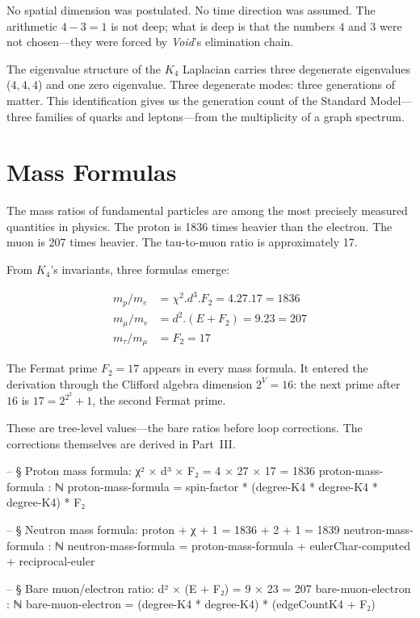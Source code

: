 \documentclass[11pt,a4paper]{book}
\def\cdot{.}%
\begin{document}
No spatial dimension was postulated. No time direction was assumed. The arithmetic $4 - 3 = 1$ is not deep; what is deep is that the numbers $4$ and $3$ were not chosen---they were forced by \textit{Void}'s elimination chain.%

The eigenvalue structure of the $K_4$ Laplacian carries three degenerate eigenvalues ($4, 4, 4$) and one zero eigenvalue. Three degenerate modes: three generations of matter. This identification gives us the generation count of the Standard Model---three families of quarks and leptons---from the multiplicity of a graph spectrum.

\section{Mass Formulas}

The mass ratios of fundamental particles are among the most precisely measured quantities in physics. The proton is 1836 times heavier than the electron. The muon is 207 times heavier. The tau-to-muon ratio is approximately 17.

From $K_4$'s invariants, three formulas emerge:

\begin{align}
m_p / m_e &= \chi^2 \cdot d^3 \cdot F_2 = 4 \cdot 27 \cdot 17 = 1836 \\
m_\mu / m_e &= d^2 \cdot (E + F_2) = 9 \cdot 23 = 207 \\
m_\tau / m_\mu &= F_2 = 17
\end{align}

The Fermat prime $F_2 = 17$ appears in every mass formula. It entered the derivation through the Clifford algebra dimension $2^V = 16$: the next prime after $16$ is $17 = 2^{2^2} + 1$, the second Fermat prime.%

These are tree-level values---the bare ratios before loop corrections. The corrections themselves are derived in Part~III.

\begin{code}
-- § Proton mass formula: χ² × d³ × F₂ = 4 × 27 × 17 = 1836
proton-mass-formula : ℕ
proton-mass-formula = spin-factor * (degree-K4 * degree-K4 * degree-K4) * F₂

-- § Neutron mass formula: proton + χ + 1 = 1836 + 2 + 1 = 1839
neutron-mass-formula : ℕ
neutron-mass-formula = proton-mass-formula + eulerChar-computed + reciprocal-euler

-- § Bare muon/electron ratio: d² × (E + F₂) = 9 × 23 = 207
bare-muon-electron : ℕ
bare-muon-electron = (degree-K4 * degree-K4) * (edgeCountK4 + F₂)
\end{code}
\end{document}
